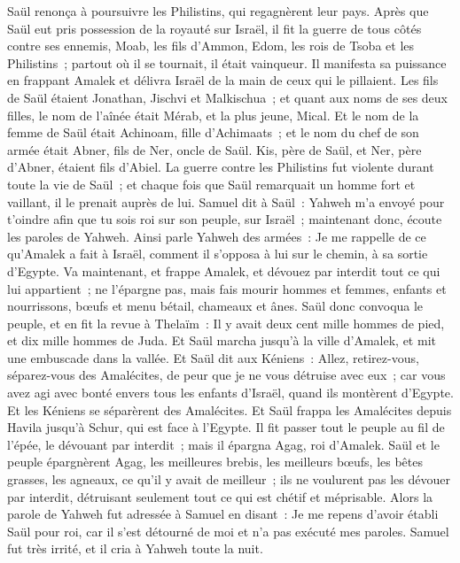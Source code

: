 \begin{multicols}{2}
Saül renonça à poursuivre les Philistins, qui regagnèrent leur pays.
Après que Saül eut pris possession de la royauté sur Israël, il fit la guerre de tous côtés contre ses ennemis, Moab, les fils d'Ammon, Edom, les rois de Tsoba et les Philistins~; partout où il se tournait, il était vainqueur.
Il manifesta sa puissance en frappant Amalek et délivra Israël de la main de ceux qui le pillaient.
Les fils de Saül étaient Jonathan, Jischvi et Malkischua~; et quant aux noms de ses deux filles, le nom de l'aînée était Mérab, et la plus jeune, Mical.
Et le nom de la femme de Saül était Achinoam, fille d'Achimaats~; et le nom du chef de son armée était Abner, fils de Ner, oncle de Saül.
Kis, père de Saül, et Ner, père d'Abner, étaient fils d'Abiel.
La guerre contre les Philistins fut violente durant toute la vie de Saül~; et chaque fois que Saül remarquait un homme fort et vaillant, il le prenait auprès de lui.
\VerseOne{}Samuel dit à Saül~: Yahweh m'a envoyé pour t'oindre afin que tu sois roi sur son peuple, sur Israël~; maintenant donc, écoute les paroles de Yahweh.
Ainsi parle Yahweh des armées~: Je me rappelle de ce qu'Amalek a fait à Israël, comment il s'opposa à lui sur le chemin, à sa sortie d'Egypte.
Va maintenant, et frappe Amalek, et dévouez par interdit tout ce qui lui appartient~; ne l'épargne pas, mais fais mourir hommes et femmes, enfants et nourrissons, bœufs et menu bétail, chameaux et ânes.
Saül donc convoqua le peuple, et en fit la revue à Thelaïm~: Il y avait deux cent mille hommes de pied, et dix mille hommes de Juda.
Et Saül marcha jusqu'à la ville d'Amalek, et mit une embuscade dans la vallée.
Et Saül dit aux Kéniens~: Allez, retirez-vous, séparez-vous des Amalécites, de peur que je ne vous détruise avec eux~; car vous avez agi avec bonté envers tous les enfants d'Israël, quand ils montèrent d'Egypte. Et les Kéniens se séparèrent des Amalécites.
Et Saül frappa les Amalécites depuis Havila jusqu'à Schur, qui est face à l'Egypte.
Il fit passer tout le peuple au fil de l'épée, le dévouant par interdit~; mais il épargna Agag, roi d'Amalek.
Saül et le peuple épargnèrent Agag, les meilleures brebis, les meilleurs bœufs, les bêtes grasses, les agneaux, ce qu'il y avait de meilleur~; ils ne voulurent pas les dévouer par interdit, détruisant seulement tout ce qui est chétif et méprisable.
Alors la parole de Yahweh fut adressée à Samuel en disant~:
Je me repens d'avoir établi Saül pour roi, car il s'est détourné de moi et n'a pas exécuté mes paroles. Samuel fut très irrité, et il cria à Yahweh toute la nuit.

\end{multicols}
